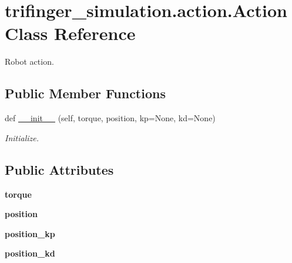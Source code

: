 \hypertarget{classtrifinger__simulation_1_1action_1_1Action}{}\section{trifinger\+\_\+simulation.\+action.\+Action Class Reference}
\label{classtrifinger__simulation_1_1action_1_1Action}


Robot action.  


\subsection*{Public Member Functions}
\begin{DoxyCompactItemize}
\item 
def \hyperlink{classtrifinger__simulation_1_1action_1_1Action_a8cf3247a4080f46bc05c62ba66ec8016}{\+\_\+\+\_\+init\+\_\+\+\_\+} (self, torque, position, kp=None, kd=None)
\begin{DoxyCompactList}\small\item\em Initialize. \end{DoxyCompactList}\end{DoxyCompactItemize}
\subsection*{Public Attributes}
\begin{DoxyCompactItemize}
\item 
\mbox{\label{classtrifinger__simulation_1_1action_1_1Action_afa60ba875dbdd6c4903f04760a5c20d9}} 
{\bfseries torque}
\item 
\mbox{\label{classtrifinger__simulation_1_1action_1_1Action_ad5a6eb34bca8a17b78c70df059fa01ff}} 
{\bfseries position}
\item 
\mbox{\label{classtrifinger__simulation_1_1action_1_1Action_a86037a7a4580aea71607188aeafa7bfd}} 
{\bfseries position\+\_\+kp}
\item 
\mbox{\label{classtrifinger__simulation_1_1action_1_1Action_ac42443e1e4f0be5c6db4dab6c28417c4}} 
{\bfseries position\+\_\+kd}
\end{DoxyCompactItemize}


